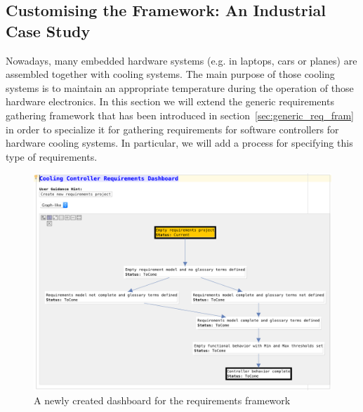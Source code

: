 
\subsection{Customising the Framework: An Industrial Case
Study}
\label{sec:custom_frame}
\vspace{-.2cm}
Nowadays, many embedded hardware systems (e.g. in laptops, cars or planes) are
assembled together with cooling systems. The main purpose of those cooling
systems is to maintain an appropriate temperature during the operation of those
hardware electronics. In this section we will extend the generic requirements
gathering framework that has been introduced in
section~\ref{sec:generic_req_fram} in order to specialize it for gathering
requirements for software controllers for hardware cooling systems. In
particular, we will add a process for specifying this type of requirements.
\vspace{-.5cm}
\begin{figure}[!h]
\centering 
\includegraphics[width=.9\textwidth]{./figures/NewDashboard.png}
\vspace{-.3cm}
\caption{A newly created dashboard for the requirements framework}
\label{fig:empty_dashboard}
\vspace{-.6cm}
\end{figure}

